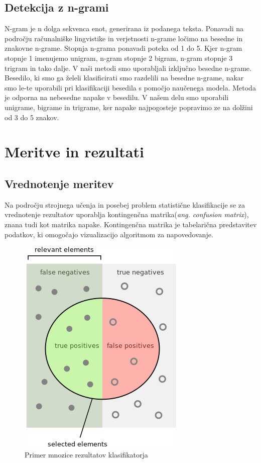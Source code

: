 \documentclass{acm_proc_article-sp}
\begin{document}
\subsection{Detekcija z n-grami}
N-gram je n dolga sekvenca enot, generirana iz podanega teksta.
Ponavadi na področju računalniške lingvistike in verjetnosti n-grame ločimo na besedne in znakovne n-grame. 
Stopnja n-grama ponavadi poteka od 1 do 5.
Kjer n-gram stopnje 1 imenujemo unigram, n-gram stopnje 2 bigram, n-gram stopnje 3 trigram in tako dalje. 
V naši metodi smo uporabljali izključno besedne n-grame.
Besedilo, ki smo ga želeli klasificirati smo razdelili na besedne n-grame, nakar smo le-te uporabili pri klasifikaciji besedila s pomočjo naučenega modela.
Metoda je odporna na nebesedne napake v besedilu.
V našem delu smo uporabili unigrame, bigrame in trigrame, ker napake najpogosteje popravimo ze na dolžini od 3 do 5 znakov.

\section{Meritve in rezultati}
\subsection{Vrednotenje meritev}
Na področju strojnega učenja in posebej problem statistične klasifikacije se za vrednotenje rezultatov uporablja kontingenčna matrika({\it ang. confusion matrix}), znana tudi kot matrika napake.
Kontingenčna matrika je tabelarična predstavitev podatkov, ki omogočajo vizualizacijo algoritmom za napovedovanje.

\begin{figure}[!h]
	\centering
	\caption{Primer mnozice rezultatov klasifikatorja} \label{mnozicaZadetkov}
	\includegraphics[scale=0.45]{Precisionrecall}
\end{figure}
\end{document}

